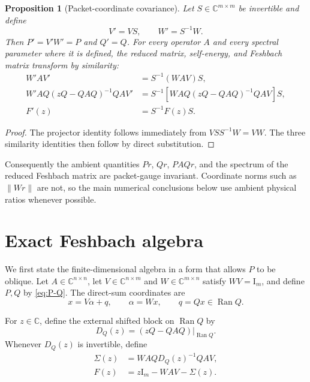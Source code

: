 \documentclass[11pt]{article}
\newtheorem{proposition}[theorem]{Proposition}
\theoremstyle{definition}
\theoremstyle{remark}
\newcommand{\C}{\mathbb C}
\newcommand{\Id}{\mathrm I}
\newcommand{\Ran}{\operatorname{Ran}}
\begin{document}
\begin{proposition}[Packet-coordinate covariance]
\label{prop:gauge}
Let $S\in\C^{m\times m}$ be invertible and define
\begin{equation}
\label{eq:gauge-pair}
 V'=VS,
 \qquad W'=S^{-1}W.
\end{equation}
Then $P'=V'W'=P$ and $Q'=Q$.  For every operator $A$ and every spectral
parameter where it is defined, the reduced matrix, self-energy, and
Feshbach matrix transform by similarity:
\begin{align}
 W'AV'&=S^{-1}(WAV)S,
 \label{eq:gauge-reduced}\\
 W'AQ(zQ-QAQ)^{-1}QAV'
 &=S^{-1}\!\left[WAQ(zQ-QAQ)^{-1}QAV\right]S,
 \label{eq:gauge-self-energy}\\
 F'(z)&=S^{-1}F(z)S.
 \label{eq:gauge-feshbach}
\end{align}
\end{proposition}

\begin{proof}
The projector identity follows immediately from
$VS S^{-1}W=VW$.  The three similarity identities then follow by direct
substitution.
\end{proof}

Consequently the ambient quantities $Pr$, $Qr$, $PAQr$, and the spectrum of
the reduced Feshbach matrix are packet-gauge invariant.  Coordinate norms
such as $\|Wr\|$ are not, so the main numerical conclusions below use
ambient physical ratios whenever possible.

\section{Exact Feshbach algebra}
\label{sec:feshbach}

We first state the finite-dimensional algebra in a form that allows $P$ to
be oblique.  Let $A\in\C^{n\times n}$, let
$V\in\C^{n\times m}$ and $W\in\C^{m\times n}$ satisfy $WV=\Id_m$, and
define $P,Q$ by \eqref{eq:P-Q}.  The direct-sum coordinates are
\begin{equation}
\label{eq:direct-sum-coordinates}
 x=V\alpha+q,
 \qquad
 \alpha=Wx,
 \qquad
 q=Qx\in\Ran Q.
\end{equation}

For $z\in\C$, define the external shifted block on $\Ran Q$ by
\begin{equation}
\label{eq:external-block}
 D_Q(z)=\left.(zQ-QAQ)\right|_{\Ran Q}.
\end{equation}
Whenever $D_Q(z)$ is invertible, define
\begin{align}
 \Sigma(z)&=WAQ D_Q(z)^{-1}QAV,
 \label{eq:self-energy}\\
 F(z)&=z\Id_m-WAV-\Sigma(z).
 \label{eq:feshbach-map}
\end{align}
\end{document}
